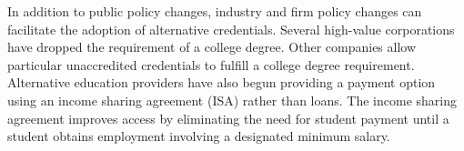 In addition to public policy changes, industry and firm policy changes can facilitate the adoption of alternative credentials.
Several high-value corporations have dropped the requirement of a college degree\cite{team_2020}.
Other companies allow particular unaccredited credentials to fulfill a college degree requirement.
Alternative education providers have also begun providing a payment option using an income sharing agreement (ISA) rather than loans.
The income sharing agreement improves access by eliminating the need for student payment
until a student obtains employment involving a designated minimum salary.
